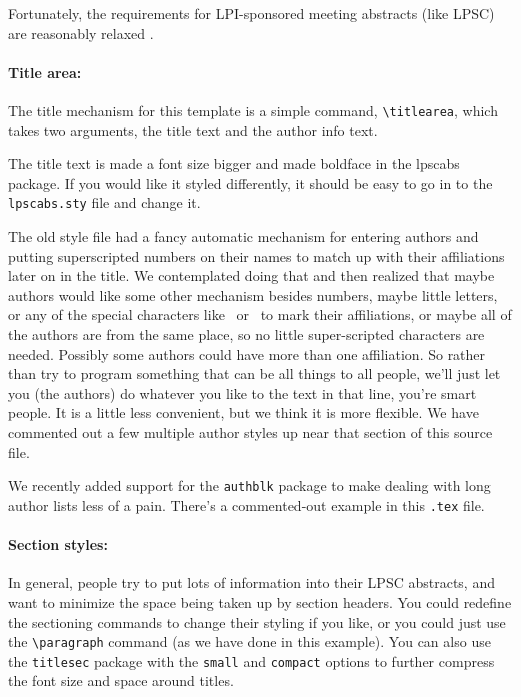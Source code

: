 \documentclass[twoside]{article}
\begin{document}
Fortunately, the requirements for LPI-sponsored meeting abstracts (like LPSC)
are reasonably relaxed \citep{LPSC}.

\paragraph{Title area:}

The title mechanism for this template is a simple command,
\verb=\titlearea=, which takes two arguments, the title text and the
author info text.

The title text is made a font size bigger and made boldface in the
lpscabs package.  If you would like it styled differently, it should
be easy to go in to the \texttt{lpscabs.sty} file and change it.

The old style file had a fancy automatic mechanism for entering
authors and putting superscripted numbers on their names to match
up with their affiliations later on in the title.  We contemplated
doing that and then realized that maybe authors would like some
other mechanism besides numbers, maybe little letters, or any of
the special characters like \dag\ or \ddag\ to mark their affiliations,
or maybe all of the authors are from the same place, so no little
super-scripted characters are needed.  Possibly some authors could
have more than one affiliation.  So rather than try to program
something that can be all things to all people, we'll just let you
(the authors) do whatever you like to the text in that line, you're
smart people.  It is a little less convenient, but we think it is more
flexible.  We have commented out a few multiple author styles up
near that section of this source file.

We recently added support for the \texttt{authblk} package to make dealing
with long author lists less of a pain.  There's a commented-out example
in this \texttt{.tex} file.

\paragraph{Section styles:}

In general, people try to put lots of information into their LPSC
abstracts, and want to minimize the space being taken up by section
headers.  You could redefine the sectioning commands to change their
styling if you like, or you could just use the \verb=\paragraph=
command (as we have done in this example).  You can also use the
\texttt{titlesec} package with the \texttt{small} and \texttt{compact}
options to further compress the font size and space around titles.
\end{document}
